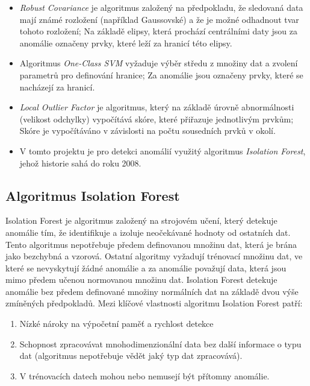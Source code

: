 \begin{itemize}
	\item \textit{Robust Covariance} je algoritmus založený na předpokladu, že sledovaná data mají známé rozložení (například Gaussovské) a že je možné odhadnout tvar tohoto rozložení; Na základě elipsy, která prochází centrálními daty jsou za anomálie označeny prvky, které leží za hranicí této elipsy. 
	\item Algoritmus \textit{One-Class SVM} vyžaduje výběr středu z množiny dat a zvolení parametrů pro definování hranice; Za anomálie jsou označeny prvky, které se nacházejí za hranicí.
	\item \textit{Local Outlier Factor} je algoritmus, který na základě úrovně abnormálnosti (velikost odchylky) vypočítává skóre, které přiřazuje jednotlivým prvkům; Skóre je vypočítáváno v závislosti na počtu sousedních prvků v okolí. 
	\item V tomto projektu je pro detekci anomálií využitý algoritmus \textit{Isolation Forest}, jehož historie sahá do roku 2008. 
\end{itemize}

\subsection*{Algoritmus Isolation Forest} \label{subsec:isolation_forest}
Isolation Forest \cite{scikit-learn} je algoritmus založený na strojovém učení, který detekuje anomálie tím, že identifikuje a izoluje neočekávané hodnoty od ostatních dat. Tento algoritmus nepotřebuje předem definovanou množinu dat, která je brána jako bezchybná a vzorová. Ostatní algoritmy vyžadují trénovací množinu dat, ve které se nevyskytují žádné anomálie a za anomálie považují data, která jsou mimo předem učenou normovanou množinu dat. Isolation Forest detekuje anomálie bez předem definované množiny normálních dat na základě dvou výše zmíněných předpokladů. Mezi klíčové vlastnosti algoritmu Isolation Forest patří: 

\begin{enumerate}
  \item Nízké nároky na výpočetní paměť a rychlost detekce
  \item Schopnost zpracovávat mnohodimenzionální data bez další informace o typu dat (algoritmus nepotřebuje vědět jaký typ dat zpracovává).
  \item V trénovacích datech mohou nebo nemusejí být přítomny anomálie.
\end{enumerate}

